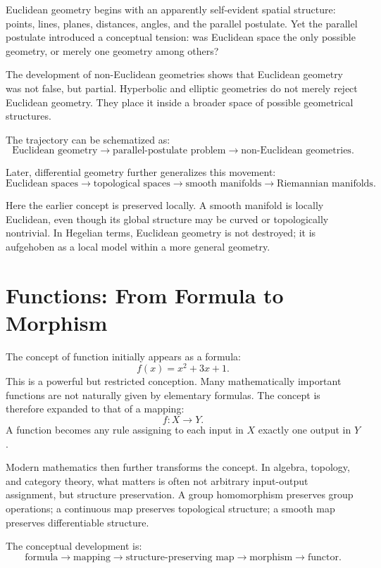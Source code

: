 \documentclass[11pt]{article}
\begin{document}
Euclidean geometry begins with an apparently self-evident spatial structure: points, lines, planes, distances, angles, and the parallel postulate. Yet the parallel postulate introduced a conceptual tension: was Euclidean space the only possible geometry, or merely one geometry among others?

The development of non-Euclidean geometries shows that Euclidean geometry was not false, but partial. Hyperbolic and elliptic geometries do not merely reject Euclidean geometry. They place it inside a broader space of possible geometrical structures.

The trajectory can be schematized as:
\[
\text{Euclidean geometry}
\longrightarrow
\text{parallel-postulate problem}
\longrightarrow
\text{non-Euclidean geometries}.
\]

Later, differential geometry further generalizes this movement:
\[
\text{Euclidean spaces}
\longrightarrow
\text{topological spaces}
\longrightarrow
\text{smooth manifolds}
\longrightarrow
\text{Riemannian manifolds}.
\]

Here the earlier concept is preserved locally. A smooth manifold is locally Euclidean, even though its global structure may be curved or topologically nontrivial. In Hegelian terms, Euclidean geometry is not destroyed; it is aufgehoben as a local model within a more general geometry.

\section{Functions: From Formula to Morphism}

The concept of function initially appears as a formula:
\[
f(x)=x^2+3x+1.
\]
This is a powerful but restricted conception. Many mathematically important functions are not naturally given by elementary formulas. The concept is therefore expanded to that of a mapping:
\[
f:X\to Y.
\]
A function becomes any rule assigning to each input in $X$ exactly one output in $Y$.

Modern mathematics then further transforms the concept. In algebra, topology, and category theory, what matters is often not arbitrary input-output assignment, but structure preservation. A group homomorphism preserves group operations; a continuous map preserves topological structure; a smooth map preserves differentiable structure.

The conceptual development is:
\[
\text{formula}
\longrightarrow
\text{mapping}
\longrightarrow
\text{structure-preserving map}
\longrightarrow
\text{morphism}
\longrightarrow
\text{functor}.
\]
\end{document}
